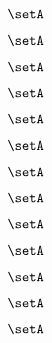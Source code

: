 \begin{forslides}
    \begin{equation}
        \label{eq:slides-processes-139}
        \setA
    \end{equation}

    \begin{equation}
        \label{eq:slides-processes-140}
        \setA
    \end{equation}

    \begin{equation}
        \label{eq:slides-processes-141}
        \setA
    \end{equation}

    \begin{equation}
        \label{eq:slides-processes-142}
        \setA
    \end{equation}

    \begin{equation}
        \label{eq:slides-processes-143}
        \setA
    \end{equation}

    \begin{equation}
        \label{eq:slides-processes-144}
        \setA
    \end{equation}

    \begin{equation}
        \label{eq:slides-processes-145}
        \setA
    \end{equation}

    \begin{equation}
        \label{eq:slides-processes-146}
        \setA
    \end{equation}

    \begin{equation}
        \label{eq:slides-processes-147}
        \setA
    \end{equation}

    \begin{equation}
        \label{eq:slides-processes-148}
        \setA
    \end{equation}

    \begin{equation}
        \label{eq:slides-processes-149}
        \setA
    \end{equation}

    \begin{equation}
        \label{eq:slides-processes-150}
        \setA
    \end{equation}

    \begin{equation}
        \label{eq:slides-processes-151}
        \setA
    \end{equation}


\end{forslides}
